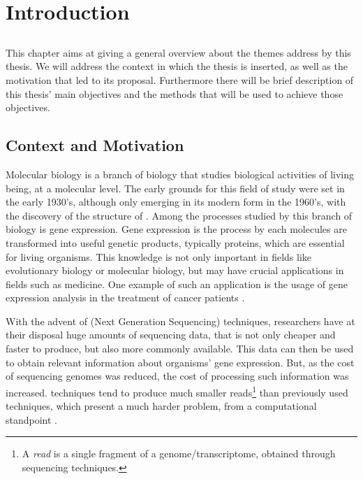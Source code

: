 \chapter{Introduction} \label{chap:intro}

\section*{}

This chapter aims at giving a general overview about the themes address by this
thesis. We will address the context in which the thesis is inserted, as well as
the motivation that led to its proposal. Furthermore there will be brief
description of this thesis' main objectives and the methods that will be used to
achieve those objectives.

\section{Context and Motivation} \label{sec:context}

Molecular biology is a branch of biology that studies biological activities of
living being, at a molecular level. The early grounds for this field of study
were set in the early 1930's, although only emerging in its modern form in the
1960's, with the discovery of the structure of \dna. Among the processes studied
by this branch of biology is gene expression. Gene expression is the process by
each \dna{} molecules are transformed into useful genetic products, typically
proteins, which are essential for living organisms. This knowledge is not only
important in fields like evolutionary biology or molecular biology, but may have
crucial applications in fields such as medicine. One example of such an
application is the usage of gene expression analysis in the treatment of cancer
patients \cite{Pusztai01062003}.

With the advent of \ngs{} (Next Generation Sequencing) techniques, researchers
have at their disposal huge amounts of sequencing data, that is not only cheaper
and faster to produce, but also more commonly available. This data can then be
used to obtain relevant information about organisms' gene expression. But, as
the cost of sequencing genomes was reduced, the cost of processing such
information was increased. \ngs{} techniques tend to produce much smaller
reads\footnote{A \textit{read} is a single fragment of a genome/transcriptome,
obtained through sequencing techniques.} than previously used techniques, which
present a much harder problem, from a computational standpoint \cite{Wolf2013}.

